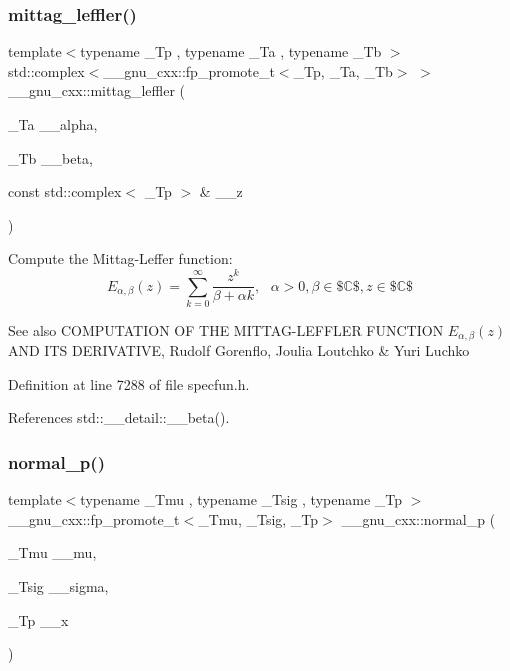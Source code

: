 \subsubsection{\texorpdfstring{mittag\+\_\+leffler()}{mittag\_leffler()}}
{\footnotesize\ttfamily template$<$typename \+\_\+\+Tp , typename \+\_\+\+Ta , typename \+\_\+\+Tb $>$ \\
std\+::complex$<$\+\_\+\+\_\+gnu\+\_\+cxx\+::fp\+\_\+promote\+\_\+t$<$\+\_\+\+Tp, \+\_\+\+Ta, \+\_\+\+Tb$>$ $>$ \+\_\+\+\_\+gnu\+\_\+cxx\+::mittag\+\_\+leffler (\begin{DoxyParamCaption}\item[{\+\_\+\+Ta}]{\+\_\+\+\_\+alpha,  }\item[{\+\_\+\+Tb}]{\+\_\+\+\_\+beta,  }\item[{const std\+::complex$<$ \+\_\+\+Tp $>$ \&}]{\+\_\+\+\_\+z }\end{DoxyParamCaption})\hspace{0.3cm}{\ttfamily [inline]}}

Compute the Mittag-\/\+Leffer function\+: \[ E_{\alpha,\beta}(z) = \sum_{k=0}^\infty \frac{z^k}{\beta + \alpha k}, \mbox{ } \alpha > 0, \beta \in \$\mathbb{C}\$, z \in \$\mathbb{C}\$ \]

\begin{DoxySeeAlso}{See also}
C\+O\+M\+P\+U\+T\+A\+T\+I\+ON OF T\+HE M\+I\+T\+T\+A\+G-\/\+L\+E\+F\+F\+L\+ER F\+U\+N\+C\+T\+I\+ON $ E_{\alpha,\beta}(z) $ A\+ND I\+TS D\+E\+R\+I\+V\+A\+T\+I\+VE, Rudolf Gorenflo, Joulia Loutchko \& Yuri Luchko 
\end{DoxySeeAlso}


Definition at line 7288 of file specfun.\+h.



References std\+::\+\_\+\+\_\+detail\+::\+\_\+\+\_\+beta().

\mbox{\label{group__gnu__math__spec__func_gaeb735b0fb98c7684ba61b8940f50193c}} 
\subsubsection{\texorpdfstring{normal\+\_\+p()}{normal\_p()}}
{\footnotesize\ttfamily template$<$typename \+\_\+\+Tmu , typename \+\_\+\+Tsig , typename \+\_\+\+Tp $>$ \\
\+\_\+\+\_\+gnu\+\_\+cxx\+::fp\+\_\+promote\+\_\+t$<$\+\_\+\+Tmu, \+\_\+\+Tsig, \+\_\+\+Tp$>$ \+\_\+\+\_\+gnu\+\_\+cxx\+::normal\+\_\+p (\begin{DoxyParamCaption}\item[{\+\_\+\+Tmu}]{\+\_\+\+\_\+mu,  }\item[{\+\_\+\+Tsig}]{\+\_\+\+\_\+sigma,  }\item[{\+\_\+\+Tp}]{\+\_\+\+\_\+x }\end{DoxyParamCaption})\hspace{0.3cm}{\ttfamily [inline]}}



